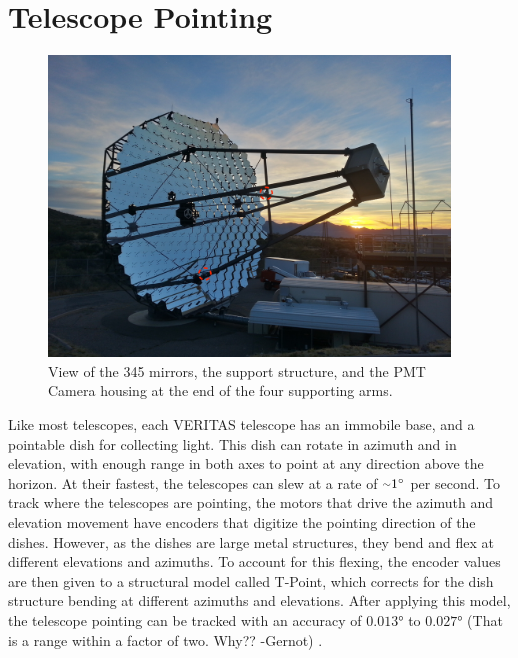 \section{Telescope Pointing}\label{sec:telpoint}

\begin{figure}[ht]
  \centering
  \includegraphics[width=0.95\textwidth]{images/single_telescope}
  \caption[Single Veritas Telescope]{
    View of the 345 mirrors, the support structure, and the PMT Camera housing at the end of the four supporting arms.}
  \label{fig:davcottel}
\end{figure}

Like most telescopes, each VERITAS telescope has an immobile base, and a pointable dish for collecting light.
This dish can rotate in azimuth and in elevation, with enough range in both axes to point at any direction above the horizon.
At their fastest, the telescopes can slew at a rate of $ \nicetilde \ang{1} $ per second.
To track where the telescopes are pointing, the motors that drive the azimuth and elevation movement have encoders that digitize the pointing direction of the dishes.
However, as the dishes are large metal structures, they bend and flex at different elevations and azimuths.
To account for this flexing, the encoder values are then given to a structural model called T-Point, which corrects for the dish structure bending at different azimuths and elevations.
After applying this model, the telescope pointing can be tracked with an accuracy of $\ang{0.013}$ to $\ang{0.027}$ {\color{red}(That is a range within a factor of two. Why?? -Gernot)} \cite{Veritas_Detector}.

